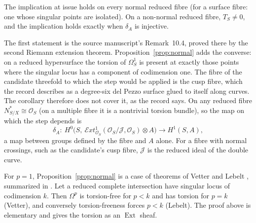 \begin{corollary}\label{cor:normal}
The implication at issue holds on every normal reduced fibre (for a surface fibre: one whose singular points are isolated). On a non-normal reduced fibre, $T_S\neq0$, and the implication holds exactly when $\delta_A$ is injective.
\end{corollary}

The first statement is the source manuscript's Remark~10.4, proved there by the second Riemann extension theorem. Proposition~\ref{prop:normal} adds the converse: on a reduced hypersurface the torsion of $\Omega^1_S$ is present at exactly those points where the singular locus has a component of codimension one. The fibre of the candidate threefold to which the step would be applied is the cusp fibre, which the record describes as a degree-six del Pezzo surface glued to itself along curves. The corollary therefore does not cover it, as the record says. On any reduced fibre $N^*_{S/X}\cong\mathcal O_S$ (on a multiple fibre it is a nontrivial torsion bundle), so the map on which the step depends is
\[
\delta_A:\ H^0\bigl(S,\ \mathcal{E}xt^1_{\mathcal O_S}(\mathcal O_S/\mathcal J,\mathcal O_S)\otimes A\bigr)\longrightarrow H^1(S,A),
\]
a map between groups defined by the fibre and $A$ alone. For a fibre with normal crossings, such as the candidate's cusp fibre, $\mathcal J$ is the reduced ideal of the double curve.

For $p=1$, Proposition~\ref{prop:normal} is a case of theorems of Vetter \cite{Vet70} and Lebelt \cite{Leb74}, summarized in \cite{MV19}. Let a reduced complete intersection have singular locus of codimension $k$. Then $\Omega^p$ is torsion-free for $p<k$ and has torsion for $p=k$ (Vetter), and conversely torsion-freeness forces $p<k$ (Lebelt). The proof above is elementary and gives the torsion as an $\operatorname{Ext}$ sheaf.

